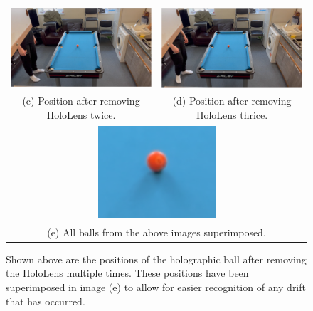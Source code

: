 \documentclass[ %
                author={Finn Alexander Wilkinson},
                supervisor={Dr. Andrew Calway},
                degree={MEng},
                title={\centering A Mixed Reality Aim Assistant for Pool and Snooker},
                subtitle={},
                type={Enterprise},
                year={2021} ]{dissertation}
\begin{document}
\begin{figure}[h!]
\begin{tabular}{cc}
         \includegraphics[scale = 0.15]{Images/Eval/Remove Headset/Frame 3 - 2 removes.PNG} & \includegraphics[scale = 0.15]{Images/Eval/Remove Headset/Frame 4 - 3 removes.PNG} \\ 
         (c) Position after removing HoloLens twice. & (d) Position after removing HoloLens thrice. \\[6pt]
         \multicolumn{2}{c}{\includegraphics[scale = 0.7]{Images/Eval/Remove Headset/Remove headset overlay.png}} \\
         \multicolumn{2}{c}{(e) All balls from the above images superimposed.}
    \end{tabular}
    \caption{Shown above are the positions of the holographic ball after removing the HoloLens multiple times. These positions have been superimposed in image (e) to allow for easier recognition of any drift that has occurred.}
    \label{fig:evalRemoveHoloLens}
\end{figure}
\end{document}
